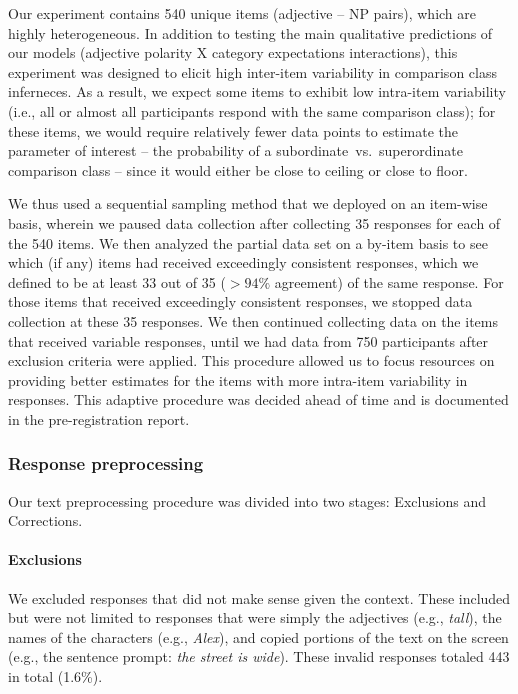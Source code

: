 \documentclass[doc]{apa6}
\begin{document}
Our experiment contains 540 unique items (adjective -- NP pairs), which are highly heterogeneous.
In addition to testing the main qualitative predictions of our models (adjective polarity X category expectations interactions), this experiment was designed to elicit high inter-item variability in comparison class inferneces.
As a result, we expect some items to exhibit low intra-item variability  (i.e., all or almost all participants respond with the same comparison class); for these items, we would require relatively fewer data points to estimate the parameter of interest -- the probability of a subordinate~vs.~superordinate comparison class -- since it would either be close to ceiling or close to floor. 

We thus used a sequential sampling method that we deployed on an item-wise basis, wherein we paused data collection after collecting 35 responses for each of the 540 items.
We then analyzed the partial data set on a by-item basis to see which (if any) items had received exceedingly consistent responses, which we defined to be at least 33 out of 35  ($>94\%$ agreement) of the same response. 
For those items that received exceedingly consistent responses, we stopped data collection at these 35 responses. 
We then continued collecting data on the items that received variable responses, until we had data from 750 participants after exclusion criteria were applied.
This procedure allowed us to focus resources on providing better estimates for the items with more intra-item variability in responses. 
This adaptive procedure was decided ahead of time and is documented in the pre-registration report. 

\subsubsection{Response preprocessing}

Our text preprocessing procedure was divided into two stages: Exclusions and Corrections. 

\paragraph{Exclusions}

We excluded responses that did not make sense given the context.
These included but were not limited to responses that were simply the adjectives (e.g., \emph{tall}), the names of the characters (e.g., \emph{Alex}), and copied portions of the text on the screen (e.g., the sentence prompt: \emph{the street is wide}). These invalid responses totaled 443 in total (1.6\%). 
\end{document}
